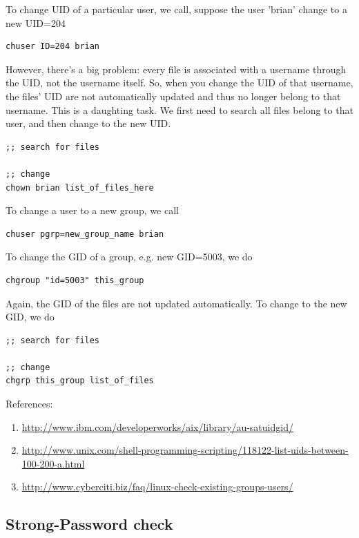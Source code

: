 To change UID of a particular user, we call, suppose the user 'brian' change to
a new UID=204
\begin{verbatim}
chuser ID=204 brian
\end{verbatim}
However, there's a big problem: every file is associated with a username through
the UID, not the username itself. So, when you change the UID of that username,
the files' UID are not automatically updated and thus no longer belong to that
username. This is a daughting task. We first need to search all files belong to
that user, and then change to the new UID. 
\begin{verbatim}
;; search for files 

;; change
chown brian list_of_files_here
\end{verbatim}

To change a user to a new group, we call
\begin{verbatim}
chuser pgrp=new_group_name brian
\end{verbatim}

To change the GID of a group, e.g. new GID=5003, we do
\begin{verbatim}
chgroup "id=5003" this_group
\end{verbatim}
Again, the GID of the files are not updated automatically. To change to the new
GID, we do
\begin{verbatim}
;; search for files

;; change
chgrp this_group list_of_files
\end{verbatim}



References:
\begin{enumerate}
  \item \url{http://www.ibm.com/developerworks/aix/library/au-satuidgid/}
  \item
  \url{http://www.unix.com/shell-programming-scripting/118122-list-uids-between-100-200-a.html}
  \item \url{http://www.cyberciti.biz/faq/linux-check-existing-groups-users/}
\end{enumerate}

 



\subsection{Strong-Password check}

